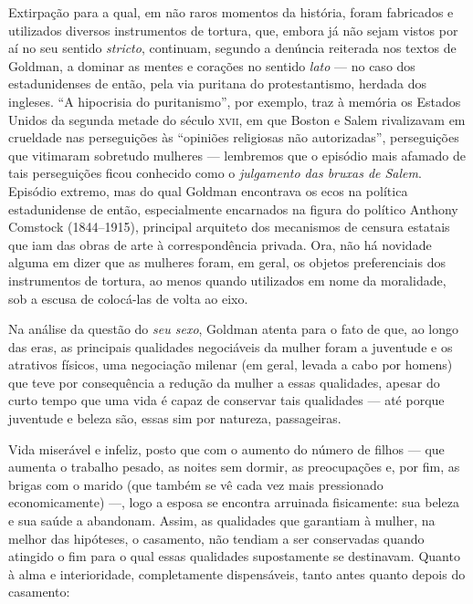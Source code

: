 Extirpação para a qual, em não raros momentos da
história, foram fabricados e utilizados diversos instrumentos de
tortura, que, embora já não sejam vistos por aí no seu
sentido \textit{stricto}, continuam, segundo a denúncia reiterada nos
textos de Goldman, a dominar as mentes e corações no sentido
\textit{lato} --- no caso dos estadunidenses de então, pela via puritana do
protestantismo, herdada dos ingleses. ``A
hipocrisia do puritanismo'', por exemplo, traz à memória os Estados Unidos da
segunda metade do século \textsc{xvii}, em que Boston e Salem rivalizavam em
crueldade nas perseguições às ``opiniões religiosas não autorizadas'',
perseguições que vitimaram sobretudo mulheres --- lembremos que o
episódio mais afamado de tais perseguições ficou conhecido como o
\textit{julgamento das bruxas de Salem}.
Episódio extremo, mas do qual Goldman encontrava os ecos na política
estadunidense de então, especialmente encarnados na figura do político
Anthony Comstock (1844--1915), principal arquiteto dos mecanismos de
censura estatais que iam das obras de arte à correspondência privada.
Ora, não há novidade alguma em dizer que as mulheres foram, em geral, os
objetos preferenciais dos instrumentos de tortura, ao menos quando
utilizados em nome da moralidade, sob a escusa de colocá-las de volta ao
eixo.

Na análise da questão do \textit{seu sexo}, Goldman
atenta para o fato de que, ao longo das eras, as principais qualidades
negociáveis da mulher foram a juventude e os atrativos físicos, uma
negociação milenar (em geral, levada a cabo por homens) que teve por
consequência a redução da mulher a essas qualidades, apesar do curto
tempo que uma vida é capaz de
conservar tais qualidades --- até porque juventude e beleza são, essas sim por natureza, passageiras.

Vida miserável e infeliz, posto que com o aumento do número
de filhos --- que aumenta o trabalho pesado, as noites sem
dormir, as preocupações e, por fim, as brigas com o marido (que também
se vê cada vez mais pressionado economicamente) ---, logo a
esposa se encontra arruinada fisicamente: sua beleza e sua saúde a
abandonam. Assim, as qualidades que garantiam à mulher, na
melhor das hipóteses, o casamento, não tendiam a ser conservadas quando
atingido o fim para o qual essas qualidades supostamente se destinavam.
Quanto à alma e interioridade, completamente dispensáveis,
tanto antes quanto depois do casamento:

